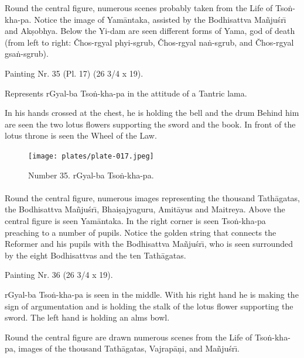\documentclass[a4paper, 12pt, oneside]{article}
\begin{document}
Round the central figure, numerous scenes probably taken from the Life of Tso\.{n}-kha-pa. Notice the image of Yam\={a}ntaka, assisted by the Bodhisattva Ma\~{n}ju\'{s}r\={\i} and Ak\d{s}obhya. Below the Yi-dam are seen different forms of Yama, god of death (from left to right: Čhos-rgyal phyi-sgrub, Čhos-rgyal na\.{n}-sgrub, and Čhos-rgyal gsa\.{n}-sgrub).

\bigskip

Painting Nr. 35 (Pl. 17) (26 3/4 x 19).

\bigskip

Represents rGyal-ba Tso\.{n}-kha-pa in the attitude of a Tantric lama.

In his hands crossed at the chest, he is holding the bell and the drum Behind him are seen the two lotus flowers supporting the sword and the book. In front of the lotus throne is seen the Wheel of the Law.

\clearpage
\vspace*{\fill}
\begin{figure}[H]
\centering
\texttt{[image: plates/plate-017.jpeg]}
\caption*{Number 35. rGyal-ba Tso\.{n}-kha-pa.}
\end{figure}
\vspace*{\fill}
\clearpage
\paragraph{}
Round the central figure, numerous images representing the thousand Tath\={a}gatas, the Bodhisattva Ma\~{n}ju\'{s}r\={\i}, Bhai\d{s}ajyaguru, Amit\={a}yus and Maitreya. Above the central figure is seen Yam\={a}ntaka. In the right corner is seen Tso\.{n}-kha-pa preaching to a number of pupils. Notice the golden string that connects the Reformer and his pupils with the Bodhisattva Ma\~{n}ju\'{s}r\={\i}, who is seen surrounded by the eight Bodhisattvas and the ten Tath\={a}gatas.

\bigskip

Painting Nr. 36 (26 3/4 x 19).

\bigskip

rGyal-ba Tso\.{n}-kha-pa is seen in the middle. With his right hand he is making the sign of argumentation and is holding the stalk of the lotus flower supporting the sword. The left hand is holding an alms bowl.

Round the central figure are drawn numerous scenes from the Life of Tso\.{n}-kha-pa, images of the thousand Tath\={a}gatas, Vajrap\={a}\d{n}i, and Ma\~{n}ju\'{s}r\={\i}.
\end{document}
